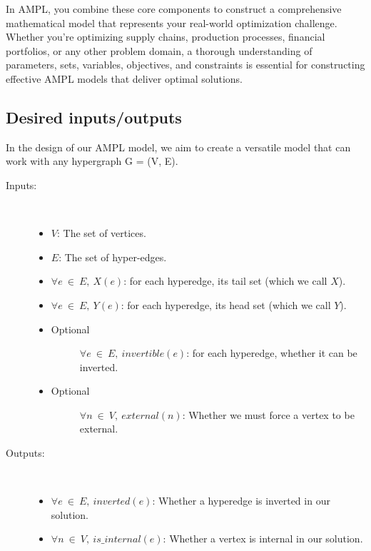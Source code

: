     


In AMPL, you combine these core components to construct a comprehensive mathematical model that represents your real-world optimization challenge. Whether you're optimizing supply chains, production processes, financial portfolios, or any other problem domain, a thorough understanding of parameters, sets, variables, objectives, and constraints is essential for constructing effective AMPL models that deliver optimal solutions.


\subsection{Desired inputs/outputs} \label{sec:io}
In the design of our AMPL model, we aim to create a versatile model that can work with any hypergraph  G = (V, E).

\begin{description}
    \item[Inputs:] ~
    \begin{itemize}
        \item $V$: The set of vertices. 
        \item $E$: The set of hyper-edges.
        \item $\forall e\ \in\ E,\ X(e)$: for each hyperedge, its tail set (which we call $X$).
        \item $\forall e\ \in\ E,\ Y(e)$: for each hyperedge, its head set (which we call $Y$).
        \item \begin{description}
            \item[Optional] $\forall e\ \in\ E,\ invertible(e)$: for each hyperedge, whether it can be inverted.
        \end{description}
        \item \begin{description}
            \item[Optional] $\forall n\ \in\ V,\ external(n)$: Whether we must force a vertex to be external.
        \end{description}
    \end{itemize}
    \item[Outputs:] ~
    \begin{itemize}
        \item $\forall e\ \in\ E,\ inverted(e)$: Whether a hyperedge is inverted in our solution.
        \item $\forall n\ \in\ V,\ is\_internal(e)$: Whether a vertex is internal in our solution.
    \end{itemize}
\end{description}

